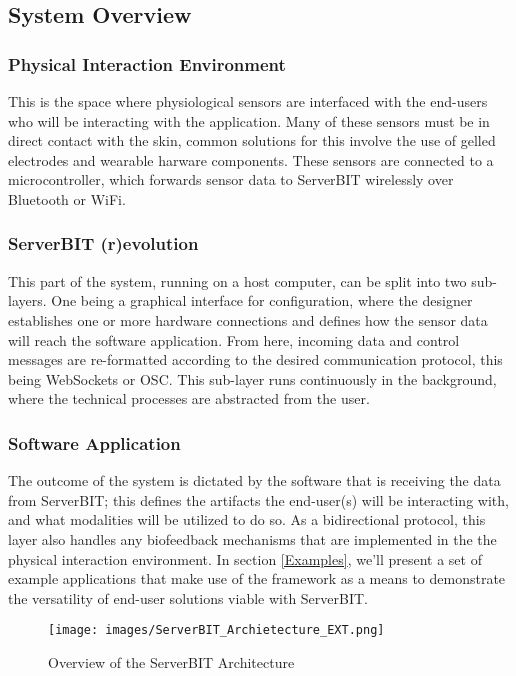 \subsection{System Overview}

\subsubsection{Physical Interaction Environment}
This is the space where physiological sensors are interfaced with the end-users who will be interacting with the application. Many of these sensors must be in direct contact with the skin, common solutions for this involve the use of gelled electrodes and wearable harware components. These sensors are connected to a microcontroller, which forwards sensor data to ServerBIT wirelessly over Bluetooth or WiFi.

\subsubsection{ServerBIT (r)evolution}
This part of the system, running on a host computer, can be split into two sub-layers. One being a graphical interface for configuration, where the designer establishes one or more hardware connections and defines how the sensor data will reach the software application. From here, incoming data and control messages are re-formatted according to the desired communication protocol, this being WebSockets or OSC. This sub-layer runs continuously in the background, where the technical processes are abstracted from the user.

\subsubsection{Software Application}
The outcome of the system is dictated by the software that is receiving the data from ServerBIT; this defines the artifacts the end-user(s) will be interacting with, and what modalities will be utilized to do so.
As a bidirectional protocol, this layer also handles any biofeedback mechanisms that are implemented in the the physical interaction environment.
In section \ref{Examples}, we'll present a set of example applications that make use of the framework as a means to demonstrate the versatility of end-user solutions viable with ServerBIT.

\newpage

\begin{figure}[ht]
    \centering
    \texttt{[image: images/ServerBIT\_Archietecture\_EXT.png]}
    \caption{Overview of the ServerBIT Architecture}
    \label{fig:diagram1}
\end{figure}

